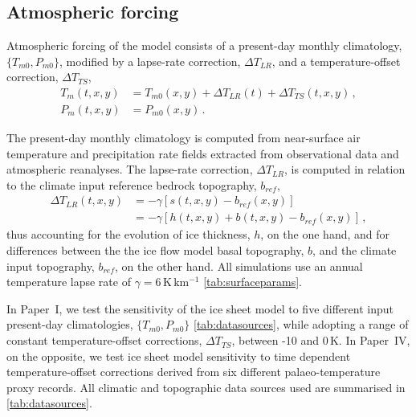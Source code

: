 \documentclass{article}
\newcommand{\unit}[1]{\ensuremath{\mathrm{#1}}}
\newcommand{\CCLI}[0]{Paper~I}      %
\newcommand{\CCYC}[0]{Paper~IV}     %
\begin{document}
\subsection{Atmospheric forcing}

Atmospheric forcing of the model consists of a present-day monthly climatology,
$\{T_{m0}, P_{m0}\}$, modified by a lapse-rate correction, ${\Delta}T_{LR}$,
and a temperature-offset correction, ${\Delta}T_{TS}$,
\begin{subequations}
\begin{align}
    T_m(t, x, y) &= T_{m0}(x, y) + {\Delta}T_{LR}(t)
                                 + {\Delta}T_{TS}(t, x, y) \,, \\
    P_m(t, x, y) &= P_{m0}(x, y) \,.
\end{align}
\end{subequations}

The present-day monthly climatology is computed from
near-surface air temperature and precipitation rate fields extracted from
observational data and atmospheric reanalyses.
The lapse-rate correction, ${\Delta}T_{LR}$, is computed in relation to the
climate input reference bedrock topography, $b_{ref}$,
\begin{align}
    {\Delta}T_{LR}(t, x, y) &= -\gamma [s(t, x, y)-b_{ref}(x, y)] \\
                            &= -\gamma [h(t, x, y)+b(t, x, y)-b_{ref}(x, y)]\,,
\end{align}
thus accounting for the evolution of ice thickness, $h$, on the one hand, and
for differences between the the ice flow model basal topography, $b$, and the
climate input topography, $b_{ref}$, on the other hand. All simulations use an
annual temperature lapse rate of $\gamma = 6\,\unit{K\,km^{-1}}$
\cref{tab:surfaceparams}.

In \CCLI, we test the sensitivity of the ice sheet model to five different input present-day
climatologies, $\{T_{m0}, P_{m0}\}$ \cref{tab:datasources}, while adopting a range of constant temperature-offset corrections,
${\Delta}T_{TS}$, between -10 and 0\,K. In \CCYC,
on the opposite, we test ice sheet model sensitivity to time dependent temperature-offset
corrections derived from six different palaeo-temperature proxy records. All
climatic and topographic data sources used are summarised in
\cref{tab:datasources}.
\end{document}
